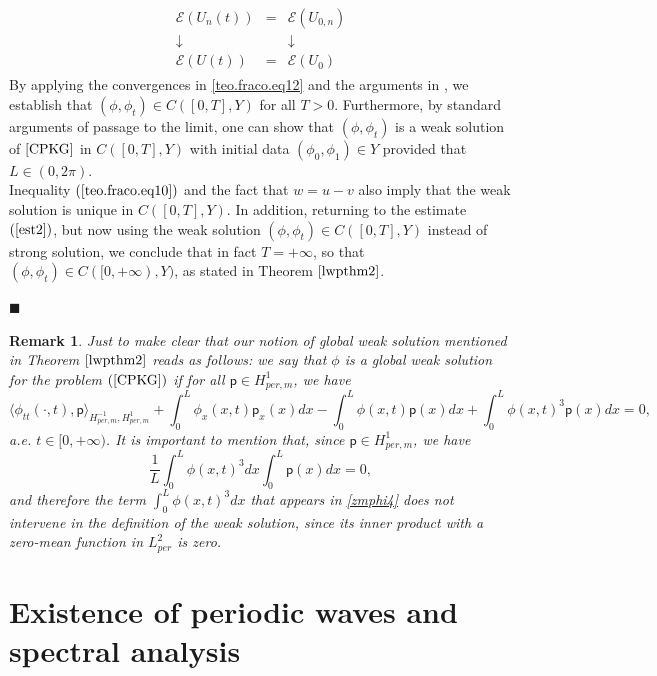 \documentclass[12pt,reqno,a4paper]{amsart} %
\numberwithin{equation}{section}
\numberwithin{figure}{section}
\newtheorem{remark}[theorem]{Remark}
\begin{document}
\begin{align}\label{teo.fraco.eq12}
\begin{array}{ccc}
	\mathcal{E}(U_n(t)) & = & \mathcal{E}(U_{0,n}) \\
	\mathrel{\downarrow} & & \mathrel{\downarrow} \\
	\mathcal{E}(U(t)) & = & \mathcal{E}(U_0)
\end{array}
\end{align}
By applying the convergences in \eqref{teo.fraco.eq12} and the arguments in \cite[Lemma 2.4.4]{cazenave}, we establish that $	(\phi, \phi_{t})\in  C([0,T],Y)$ for all $T>0$. Furthermore, by standard arguments of passage to the limit, one can show that $(\phi, \phi_t)$ is a weak solution of $\eqref{CPKG}$ in $C([0,T],Y)$ with initial data $(\phi_0,\phi_1)\in Y$ provided that $L\in (0,2\pi)$.\\
\indent Inequality $(\ref{teo.fraco.eq10})$ and the fact that $w = u - v$ also imply that the weak solution is unique in $C([0,T], Y)$. In addition, returning to the estimate $(\ref{est2})$, but now using the weak solution $(\phi, \phi_t) \in C([0,T], Y)$ instead of strong solution, we conclude that in fact $T = +\infty$, so that $(\phi, \phi_t) \in C([0,+\infty), Y)$, as stated in Theorem $\ref{lwpthm2}$.
\begin{flushright}
	$\blacksquare$
\end{flushright}

\begin{remark}\label{remweaksol} Just to make clear that our notion of global weak solution mentioned in Theorem $\ref{lwpthm2}$ reads as follows: we say that $\phi$ is a global weak solution for the problem $(\ref{CPKG})$ if for all $\mathsf{p}\in H_{per,m}^1$, we have 
	$$
	\langle \phi_{tt}(\cdot,t), \mathsf{p}\rangle_{H^{-1}_{per,m},H_{per,m}^1} + \int_{0}^{L} \phi_x(x,t)\mathsf{p}_x(x) dx-\int_{0}^{L} \phi(x,t)\mathsf{p}(x)dx + \int_{0}^{L} \phi(x,t)^3\mathsf{p}(x)dx = 0,
	$$
	a.e. $t \in [0,+\infty)$. It is important to mention that, since $\mathsf{p}\in H_{per,m}^1$, we have $$\frac{1}{L}\int_0^L\phi(x,t)^3dx\int_0^L\mathsf{p}(x)dx=0,$$ and therefore the term $\displaystyle\int_0^L \phi(x,t)^3dx$ that appears in \eqref{zmphi4} does not intervene in the definition of the weak solution, since its inner product with a zero-mean function in $L_{per}^2$ is zero.
	\end{remark}



\section{Existence of periodic waves and spectral analysis}\label{section4} 
\end{document}
